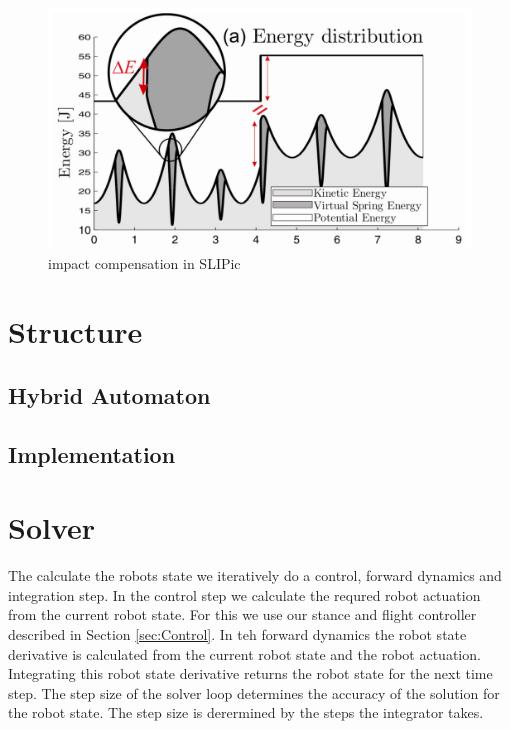 \documentclass[10pt, conference]{IEEEtran}
\begin{document}
\begin{figure}[h]
   \centering
   \includegraphics[scale=0.15]{"assets/SLIPic.png"}
   \caption{impact compensation in SLIPic \cite{Hutter2010}}
   \label{fig:SLIPic}
\end{figure}

\section{Structure}
\label{sec:Structure}
\subsection{Hybrid Automaton}
\subsection{Implementation}

\section{Solver}
\label{sec:Solver}
The calculate the robots state we iteratively do a control, forward dynamics and integration step. In the control step we calculate the requred robot actuation from 
the current robot state. For this we use our stance and flight controller described in Section \ref{sec:Control}. In teh forward dynamics the robot state derivative 
is calculated from the current robot state and the robot actuation. Integrating this robot state derivative returns the robot state for the next time step. The step size 
of the solver loop determines the accuracy of the solution for the robot state. The step size is derermined by the steps the integrator takes.
\end{document}
